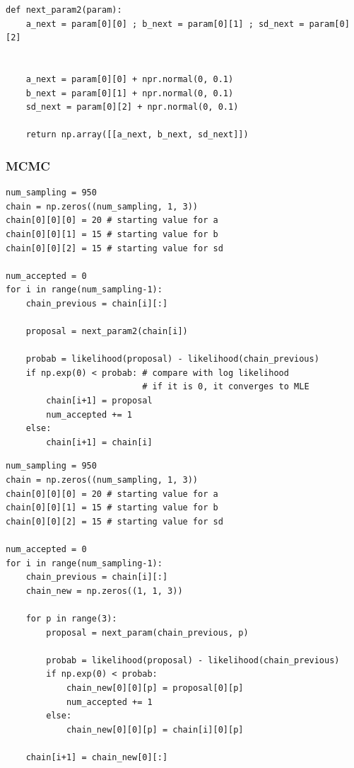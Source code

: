 \documentclass[a4paper,10.5pt,uplatex]{jsarticle}  %
\begin{document}
\begin{lstlisting}[caption={Draw all parameters at the same tine}]
def next_param2(param):
    a_next = param[0][0] ; b_next = param[0][1] ; sd_next = param[0][2]


    a_next = param[0][0] + npr.normal(0, 0.1)
    b_next = param[0][1] + npr.normal(0, 0.1)
    sd_next = param[0][2] + npr.normal(0, 0.1)

    return np.array([[a_next, b_next, sd_next]])
\end{lstlisting}

\subsubsection{MCMC}
\begin{lstlisting}[caption={Component-wise Sampling}]
num_sampling = 950
chain = np.zeros((num_sampling, 1, 3))
chain[0][0][0] = 20 # starting value for a
chain[0][0][1] = 15 # starting value for b
chain[0][0][2] = 15 # starting value for sd

num_accepted = 0
for i in range(num_sampling-1):
    chain_previous = chain[i][:]
    
    proposal = next_param2(chain[i])

    probab = likelihood(proposal) - likelihood(chain_previous)
    if np.exp(0) < probab: # compare with log likelihood
                           # if it is 0, it converges to MLE
        chain[i+1] = proposal
        num_accepted += 1
    else:
        chain[i+1] = chain[i]
\end{lstlisting}

\begin{lstlisting}[caption={Block-wise Sampling}]
num_sampling = 950
chain = np.zeros((num_sampling, 1, 3))
chain[0][0][0] = 20 # starting value for a
chain[0][0][1] = 15 # starting value for b
chain[0][0][2] = 15 # starting value for sd

num_accepted = 0
for i in range(num_sampling-1):
    chain_previous = chain[i][:]
    chain_new = np.zeros((1, 1, 3))
    
    for p in range(3):
        proposal = next_param(chain_previous, p)
        
        probab = likelihood(proposal) - likelihood(chain_previous)
        if np.exp(0) < probab:
            chain_new[0][0][p] = proposal[0][p]
            num_accepted += 1
        else:
            chain_new[0][0][p] = chain[i][0][p]
            
    chain[i+1] = chain_new[0][:]
\end{lstlisting}
\end{document}
